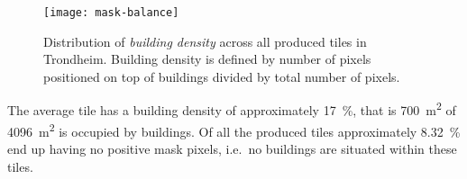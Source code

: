 \begin{figure}[H]
  \centering
  \texttt{[image: mask-balance]}
  \caption{%
    Distribution of \textit{building density} across all produced tiles in Trondheim.
    Building density is defined by number of pixels positioned on top of buildings divided by total number of pixels.
  }%
  \label{fig:mask-class-balance}
\end{figure}

The average tile has a building density of approximately \SI{17}{\percent}, that is \SI{700}{\meter\squared} of \SI{4096}{\meter\squared} is occupied by buildings.
Of all the produced tiles approximately \SI{8.32}{\percent} end up having no positive mask pixels, i.e.\ no buildings are situated within these tiles.
